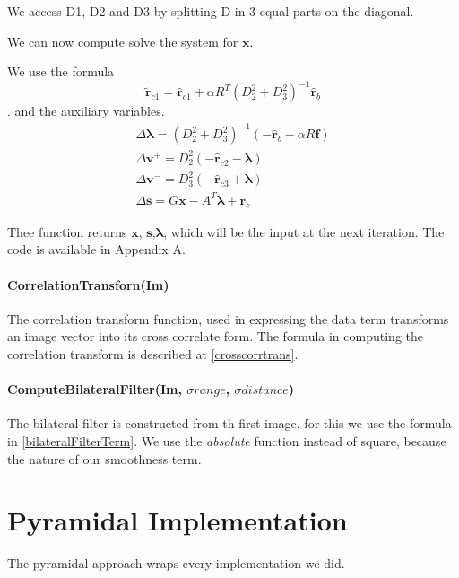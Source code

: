 \documentclass[12pt,a4paper,twoside]{report}
\begin{document}
{We access D1, D2 and D3 by splitting D in 3 equal parts on the diagonal.

We can now compute solve the system for $\boldsymbol{x}$.

 We use the formula $$\tilde{\boldsymbol{r}}_{c1} = \hat{\boldsymbol{r}}_{c1} + \alpha R ^T( D_2^{2} +  D_3^{2} )^{-1} \hat{\boldsymbol{r}}_{b}$$.
 and the auxiliary variables.
 \begin{equation}
 \begin{split}
 \Delta\boldsymbol{\lambda} = ( D_2^{2} +  D_3^{2} )^{-1}
 (-\hat{\boldsymbol{r}}_{b} - \alpha R \boldsymbol{f})\\
 \Delta\boldsymbol{v}^+ = D_2^{2}(-\hat{\boldsymbol{r}}_{c2} - \boldsymbol{\lambda})\\
 \Delta\boldsymbol{v}^- = D_3^{2}(-\hat{\boldsymbol{r}}_{c3} + \boldsymbol{\lambda})\\
 \Delta\boldsymbol{s} =  G  \boldsymbol{x} -  A^T\boldsymbol{\lambda} + \boldsymbol{r}_c
 \end{split}
 \end{equation}
 
 Thee function returns $\boldsymbol{x}$, $\boldsymbol{s}$,$\boldsymbol{\lambda}$, which will be the input at the next iteration. The code is available in Appendix A.

\paragraph{CorrelationTransforn(Im)}

The correlation transform function, used in expressing the data term transforms an image vector into its cross correlate form. The formula in computing the correlation transform is described at \ref{crosscorrtrans}.

\paragraph{ComputeBilateralFilter(Im, $\sigma range$, $\sigma distance$)}  The bilateral filter is constructed from th first image. for this we use the formula in \ref{bilateralFilterTerm}. We use the \textit{absolute} function instead of square, because the nature of our smoothness term.

\section{Pyramidal Implementation} \label{pyr}
The pyramidal approach wraps every implementation we did. 

}
\end{document}
